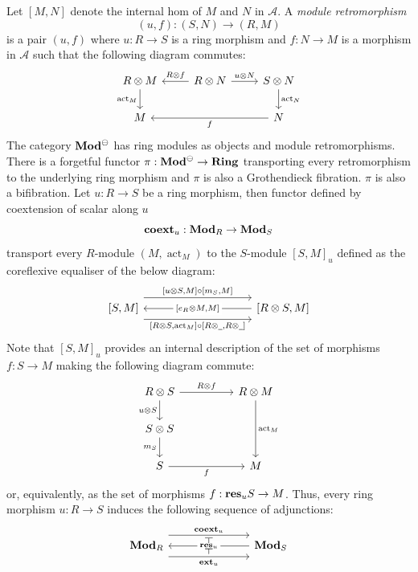 \documentclass[8pt]{article}
\theoremstyle{definition}
\theoremstyle{definition}
\theoremstyle{definition}
\theoremstyle{definition}
\theoremstyle{definition}
\theoremstyle{definition}
\theoremstyle{definition}
\theoremstyle{definition}
\theoremstyle{definition}
\theoremstyle{definition}
\theoremstyle{definition}
\theoremstyle{definition}
\theoremstyle{definition}
\theoremstyle{definition}
\theoremstyle{question}
\begin{document}
Let $[M, N]$ denote the internal hom of $M$ and $N$ in $\mathcal{A}$. A \emph{module retromorphism}
\[
(u, f) : (S, N) \to (R, M)
\]
is a pair $(u, f)$ where $u : R \to S$ is a ring morphism and $f : N \to M$ is a morphism in $\mathcal{A}$ such that the following diagram commutes:
\[
\begin{tikzcd}
  R \otimes M \ar[d, "\operatorname{act}_M"'] & R \otimes N \ar[l, "R \otimes f"'] \ar[r, "u \otimes N"] & S \otimes N \ar[d, "\operatorname{act}_N"]\\ 
  M && N \ar[ll, "f"]
\end{tikzcd}
\]
The category ${\bf Mod}^{\ominus}$ has ring modules as objects and module retromorphisms. There is a forgetful functor $\pi : {\bf Mod}^{\ominus} \to {\bf Ring}$
transporting every retromorphism to the underlying ring morphism and $\pi$ is also a Grothendieck fibration. 
$\pi$ is also a bifibration. Let $u : R \to S$ be a ring morphism, then functor defined by coextension of scalar along $u$
\[
{\bf coext}_u : {\bf Mod}_R \to {\bf Mod}_S
\]
transport every $R$-module $(M, \operatorname{act}_M)$ to the $S$-module $[S,M]_u$ defined as the coreflexive equaliser of the below diagram:
\[
\begin{tikzcd}
  {[S,M]} \ar[rrrr, shift left=4, "{[u \otimes S, M]} \circ {[m_S, M]}"] \ar[rrrr, shift right=4, "{[R  \otimes S, \operatorname{act}_M]} \circ {[R \otimes \underline{\:\:}, R \otimes \underline{\:\:}]}"'] &&&& {[R \otimes S, M]} \ar[llll, "{[e_R \otimes M, M]}" description]
\end{tikzcd}
\]
Note that $[S,M]_u$ provides an internal description of the set of morphisms $f : S \to M$ making the following diagram commute:
\[
\begin{tikzcd}
  R \otimes S \ar[rr, "R \otimes f"] \ar[d, "u \otimes S"'] && R \otimes M \ar[dd, "\operatorname{act}_M"]\\
  S \otimes S \ar[d, "m_S"'] \\
  S \ar[rr, "f"'] && M
\end{tikzcd}
\]
or, equivalently, as the set of morphisms $f : {\bf res}_u S \to M$. Thus, every ring morphism $u : R \to S$ induces the following sequence of 
adjunctions:
\[
\begin{tikzcd}
  {\bf Mod}_R \ar[rrr, shift left=4, "{\bf coext}_u", ""{name=coext}] \ar[rrr, shift right=4, "{\bf ext}_u"', ""{name=ext}] &&& {\bf Mod}_S \ar[lll, "{\bf res}_u" description, ""{name=res}]
  \arrow[phantom, from=coext, to=res, "\vdash" rotate=-90]
  \arrow[phantom, from=ext, to=res, "\vdash" rotate=-90]
\end{tikzcd}
\]
\end{document}

